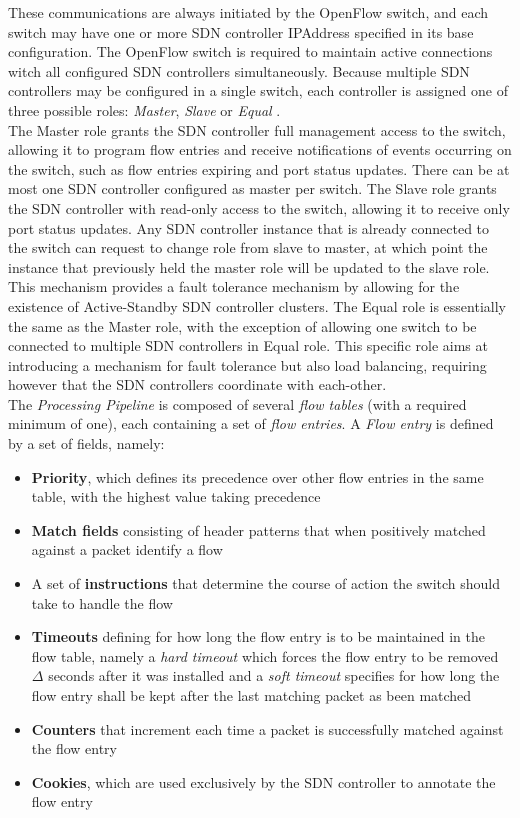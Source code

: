 These communications are always initiated by the OpenFlow switch, and each switch may have one or more \gls{SDN} controller \gls{IPAddress} specified in its base configuration.
The OpenFlow switch is required to maintain active connections witch all configured \gls{SDN} controllers simultaneously. Because multiple \gls{SDN} controllers may be configured in a single switch, each controller is assigned one of three possible roles: \emph{Master}, \emph{Slave} or \emph{Equal} \cite{OF13}.\\
The Master role grants the \gls{SDN} controller full management access to the switch, allowing it to program flow entries and receive notifications of events occurring on the switch, such as flow entries expiring and port status updates.
There can be at most one \gls{SDN} controller configured as master per switch.
The Slave role grants the \gls{SDN} controller with read-only access to the switch, allowing it to receive only port status updates.
Any \gls{SDN} controller instance that is already connected to the switch can request to change role from slave to master, at which point the instance that previously held the master role will be updated to the slave role.
This mechanism provides a fault tolerance mechanism by allowing for the existence of Active-Standby \gls{SDN} controller clusters. 
The Equal role is essentially the same as the Master role, with the exception of allowing one switch to be connected to multiple \gls{SDN} controllers in Equal role.
This specific role aims at introducing a mechanism for fault tolerance but also load balancing, requiring however that the \gls{SDN} controllers coordinate with each-other.\\
The \emph{Processing Pipeline} is composed of several \emph{flow tables} (with a required minimum of one), each containing a set of \emph{flow entries}.
A \emph{Flow entry} is defined by a set of fields, namely:
\begin{itemize}
	\item \textbf{Priority}, which defines its precedence over other flow entries in the same table, with the highest value taking precedence
	\item \textbf{Match fields} consisting of header patterns that when positively matched against a packet identify a flow
	\item A set of \textbf{instructions} that determine the course of action the switch should take to handle the flow
	\item \textbf{Timeouts} defining for how long the flow entry is to be maintained in the flow table, namely a \emph{hard timeout} which forces the flow entry to be removed $\Delta$ seconds after it was installed and a \emph{soft timeout} specifies for how long the flow entry shall be kept after the last matching packet as been matched
	\item \textbf{Counters} that increment each time a packet is successfully matched against the flow entry
	\item \textbf{Cookies}, which are used exclusively by the \gls{SDN} controller to annotate the flow entry
\end{itemize}
